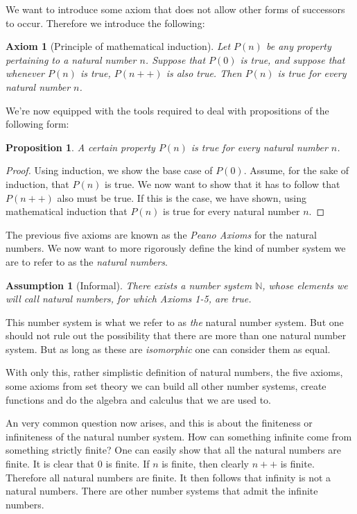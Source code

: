 \documentclass[a4paper, twocolumn]{report}
\newcounter{dummy} \numberwithin{dummy}{section}
\newcounter{axmcntr} \numberwithin{axmcntr}{chapter}
\newtheorem{axm}[axmcntr]{Axiom}
\newtheorem{prp}[dummy]{Proposition}
\newtheorem{asm}[dummy]{Assumption}
\begin{document}
We want to introduce some axiom that does not allow other forms of successors to occur.
Therefore we introduce the following:

\begin{axm}[Principle of mathematical induction]
  Let $P\left( n \right)$ be any property pertaining to a natural number $n$.
  Suppose that $P\left( 0 \right)$ is true, and suppose that whenever $P\left(
  n \right)$ is true, $P(n++)$ is also true. Then $P(n)$ is true for every
  natural number $n$. 
\end{axm}

We're now equipped with the tools required to deal with propositions of the following form:
\begin{prp}
  A certain property $P(n)$ is true for every natural number $n$.  
\end{prp}
\begin{proof}
  Using induction, we show the base case of $P(0)$. Assume, for the sake of
  induction, that $P(n)$ is true. We now want to show that it has to follow
  that $P(n++)$ also must be true. If this is the case, we have shown, using
  mathematical induction that $P(n)$ is true for every natural number $n$.
\end{proof}

The previous five axioms are known as the \textit{Peano Axioms} for the natural
numbers.  We now want to more rigorously define the kind of number system we
are to refer to as the \textit{natural numbers}.

\begin{asm}[Informal]
  There exists a number system $\mathbb{N}$, whose elements we will call
  \textrm{natural numbers}, for which Axioms 1-5, are true.
\end{asm}

This number system is what we refer to as \textit{the} natural number system.
But one should not rule out the possibility that there are more than one
natural number system. But as long as these are \textit{isomorphic} one can
consider them as equal.

With only this, rather simplistic definition of natural numbers, the five
axioms, some axioms from set theory we can build all other number systems,
create functions and do the algebra and calculus that we are used to.

An very common question now arises, and this is about the finiteness or
infiniteness of the natural number system.  How can something infinite come
from something strictly finite?  One can easily show that all the natural
numbers are finite. It is clear that $0$ is finite. If $n$ is finite, then
clearly $n++$ is finite. Therefore all natural numbers are finite.  It then
follows that infinity is not a natural numbers. There are other number systems
that admit the infinite numbers.  
\end{document}
